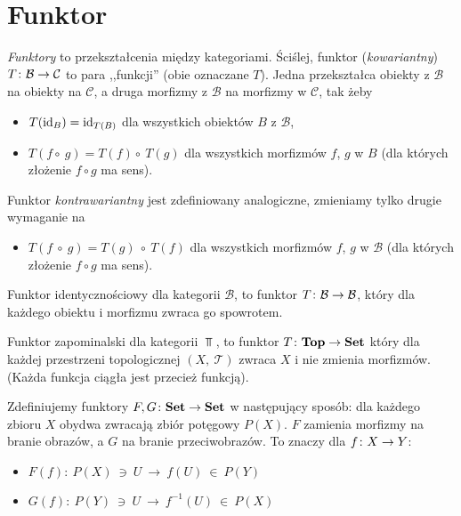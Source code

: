 \section{Funktor}
\emph{Funktory} to przekształcenia między kategoriami. Ściślej, funktor (\emph{kowariantny}) $T\colon \mathcal B\to \mathcal C$ to para ,,funkcji'' (obie oznaczane $T$). Jedna przekształca obiekty z $\mathcal B$ na obiekty na $\mathcal C$, a druga morfizmy z $\mathcal B$ na morfizmy w $\mathcal C$, tak żeby
\begin{itemize}
\item $T(\mathrm{id}_{B}) = \mathrm{id}_{T(B)}$ dla wszystkich obiektów $B$ z $\mathcal B$,
\item $T(f\circ\ g) = T(f) \circ\ T(g)$ dla wszystkich morfizmów $f$, $g$ w $B$ (dla których złożenie $f\circ g$ ma sens).
\end{itemize}
Funktor \emph{kontrawariantny} jest zdefiniowany analogiczne, zmieniamy tylko drugie wymaganie na
\begin{itemize}
	\item $T(f\  \circ\ g) = T(g)\ \circ\ T(f)$ dla wszystkich morfizmów $f$, $g$ w $\mathcal B$ (dla których złożenie $f\circ g$ ma sens).
\end{itemize}

\begin{example}
	Funktor identycznościowy dla kategorii $\mathcal B$, to funktor $T\colon \mathcal B\to \mathcal B$, który dla każdego obiektu i morfizmu zwraca go spowrotem.
\end{example}

\begin{example}
	Funktor zapominalski dla kategorii $\Top$, to funktor $T\colon \textbf{Top}\to \textbf{Set}$ który dla każdej przestrzeni topologicznej $(X,\  \mathcal T)$ zwraca  $X$ i nie zmienia morfizmów. (Każda funkcja ciągła jest przecież funkcją).
\end{example}

\begin{example}
	Zdefiniujemy funktory $F, G\colon \textbf{Set}\to \textbf{Set}$ w następujący sposób: dla każdego zbioru $X$ obydwa zwracają zbiór potęgowy $P(X)$. $F$ zamienia morfizmy na branie obrazów, a $G$ na branie przeciwobrazów. To znaczy dla $f\colon X\to Y$:
	\begin{itemize}
		\item $F(f):\ P(X)\ \ni\ U\ \to\ f(U)\ \in\ P(Y)$
		\item $G(f):\ P(Y)\ \ni\ U\ \to\ f^{-1}(U)\ \in\ P(X)$
	\end{itemize}
\end{example}

